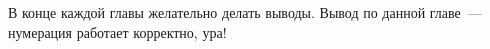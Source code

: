 %
%

\chapterconclusion

В конце каждой главы желательно делать выводы. Вывод по данной главе~--- нумерация работает корректно, ура!